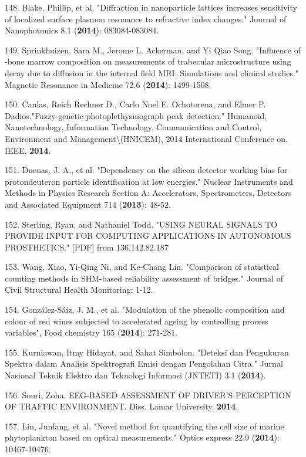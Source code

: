 148. Blake, Phillip, et al. "Diffraction in nanoparticle lattices increases sensitivity of localized surface plasmon resonance to refractive index changes." Journal of Nanophotonics 8.1 (\textbf{2014}): 083084-083084.

149. Sprinkhuizen, Sara M., Jerome L. Ackerman, and Yi Qiao Song. "Influence of -bone marrow composition on measurements of trabecular microstructure using decay due to diffusion in the internal field MRI: Simulations and clinical studies." Magnetic Resonance in Medicine 72.6 (\textbf{2014}): 1499-1508.

150. Canlas, Reich Rechner D., Carlo Noel E. Ochotorena, and Elmer P. Dadios,"Fuzzy-genetic photoplethysmograph peak detection." Humanoid, Nanotechnology, Information Technology, Communication and Control, Environment and Management\textbackslash (HNICEM), 2014 International Conference on. IEEE, \textbf{2014}.

151. Duenas, J. A., et al. "Dependency on the silicon detector working bias for proton\textendash{}deuteron particle identification at low energies." Nuclear Instruments and Methods in Physics Research Section A: Accelerators, Spectrometers, Detectors and Associated Equipment 714 (\textbf{2013}): 48-52.

152. Sterling, Ryan, and Nathaniel Todd. "USING NEURAL SIGNALS TO PROVIDE INPUT FOR COMPUTING APPLICATIONS IN AUTONOMOUS PROSTHETICS." [PDF] from 136.142.82.187

153. Wang, Xiao, Yi-Qing Ni, and Ke-Chang Lin. "Comparison of statistical counting methods in SHM-based reliability assessment of bridges." Journal of Civil Structural Health Monitoring: 1-12.

154. Gonz\'{a}lez-S\'{a}iz, J. M., et al. "Modulation of the phenolic composition and colour of red wines subjected to accelerated ageing by controlling process variables", Food chemistry 165 (\textbf{2014}): 271-281.

155. Kurniawan, Itmy Hidayat, and Sahat Simbolon. "Deteksi dan Pengukuran Spektra dalam Analisis Spektrografi Emisi dengan Pengolahan Citra." Jurnal Nasional Teknik Elektro dan Teknologi Informasi (JNTETI) 3.1 (\textbf{2014}).

156. Souri, Zoha. EEG-BASED ASSESSMENT OF DRIVER’S PERCEPTION OF TRAFFIC ENVIRONMENT. Diss. Lamar University, \textbf{2014}.

157. Lin, Junfang, et al. "Novel method for quantifying the cell size of marine phytoplankton based on optical measurements." Optics express 22.9 (\textbf{2014}): 10467-10476.

